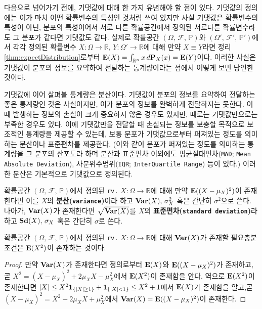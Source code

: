다음으로 넘어가기 전에, 기댓값에 대해 한 가지 유념해야 할 점이 있다. 기댓값의 정의에는 이가 마치 어떤 확률변수의 특성인 것처럼 쓰여 있지만 사실 기댓값은 확률변수의 특성이 아닌, 분포의 특성이어서 서로 다른 확률공간에서 정의된 서로다른 확률변수라도 그 분포가 같다면 기댓값도 같다. 실제로 확률공간 $(\Omega,\,\mathcal{F},\,\mathbb{P})$와 $(\Omega',\,\mathcal{F}',\,\mathbb{P}')$에서 각각 정의된 확률변수 $X:\Omega\to\mathbb{R},\,Y:\Omega'\to\mathbb{R}$에 대해 만약 $X\equiv Y$라면 정리 \ref{thm:expectDistribution}로부터 $\mathbf{E}(X)=\int_{\mathbb{R}^n}x\,d\mathbf{P}_X(x)=\mathbf{E}(Y)$이다. 이러한 사실은 기댓값이 분포의 정보를 요약하여 전달하는 통계량이라는 점에서 어떻게 보면 당연한 것이다.

기댓값에 이어 살펴볼 통계량은 분산이다. 기댓값이 분포의 정보를 요약하여 전달하는 좋은 통계량인 것은 사실이지만, 이가 분포의 정보를 완벽하게 전달하지는 못한다. 이때 발생하는 정보의 손실이 크게 중요하지 않은 경우도 있지만, 때로는 기댓값만으로는 부족한 경우도 있다. 이에 기댓값만을 전달할 때 손실되는 정보를 보충할 목적으로 보조적인 통계량을 제공할 수 있는데, 보통 분포가 기댓값으로부터 퍼져있는 정도를 의미하는 분산이나 표준편차를 제공한다. (이와 같이 분포가 퍼져있는 정도를 의미하는 통계량을 그 분포의 산포도라 하며 분산과 표준편차 이외에도 평균절대편차(\texttt{MAD}; \texttt{Mean Absolute Deviation}), 사분위수범위(\texttt{IQR}; \texttt{InterQuartile Range}) 등이 있다.) 이러한 분산은 기본적으로 기댓값으로 정의된다.

\begin{definition}
    확률공간 $(\Omega,\,\mathcal{F},\,\mathbb{P})$에서 정의된 \texttt{rv.} $X:\Omega\to\mathbb{R}$에 대해 만약 $\mathbf{E}((X-\mu_X)^2)$이 존재한다면 이를 $X$의 \textbf{분산(\texttt{variance})}이라 하고 $\mathbf{Var}(X),\,\sigma_X^2$ 혹은 간단히 $\sigma^2$으로 쓴다. 나아가, $\mathbf{Var}(X)$가 존재한다면 $\sqrt{\mathbf{Var}(X)}$를 $X$의 \textbf{표준편차(\texttt{standard deviation})}라 하고 $\mathbf{Sd}(X),\,\sigma_X$ 혹은 간단히 $\sigma$로 쓴다.
\end{definition}

\begin{proposition}
    확률공간 $(\Omega,\,\mathcal{F},\,\mathbb{P})$에서 정의된 \texttt{rv.} $X:\Omega\to\mathbb{R}$에 대해 $\mathbf{Var}(X)$가 존재할 필요충분조건은 $\mathbf{E}(X^2)$이 존재하는 것이다.
\end{proposition}

\begin{proof}
    만약 $\mathbf{Var}(X)$가 존재한다면 정의로부터 $\mathbf{E}(X)$와 $\mathbf{E}((X-\mu_X)^2)$가 존재하고, 곧 $X^2=(X-\mu_X)^2+2\mu_XX-\mu_X^2$에서 $\mathbf{E}(X^2)$이 존재함을 안다. 역으로 $\mathbf{E}(X^2)$이 존재한다면 $|X|\leq X^2\mathbf{1}_{\{|X|\geq1\}}+\mathbf{1}_{\{|X|<1\}}\leq X^2+1$에서 $\mathbf{E}(X)$가 존재함을 알고,곧 $(X-\mu_X)^2=X^2-2\mu_XX+\mu_X^2$에서 $\mathbf{Var}(X)=\mathbf{E}((X-\mu_X)^2)$이 존재한다.
\end{proof}

